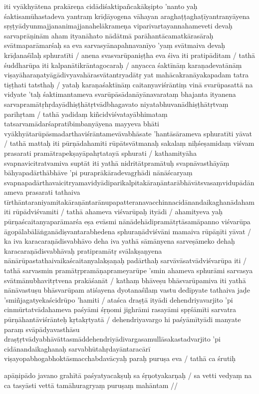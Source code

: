 iti vyākhyātena prakāreṇa cidādiśaktipañcakākṣipto 'nanto yaḥ śaktisamūhastadeva yantraṃ krīḍāyogena vāhayan araghaṭṭaghaṭīyantranyāyena sṛṣṭyādyunmajjananimajjanahelākrameṇa viparivartayannahameveti devaḥ sarvaprāṇinām aham ityanāhato nādātmā parāhantācamatkārasāraḥ svātmaparāmarśaḥ sa eva sarvasyānapahnavanīyo 'yaṃ svātmaiva devaḥ krīḍanaśīlaḥ sphuratīti  / anena svasvarūpaniṣṭha eva śiva iti pratipāditam  / tathā śuddharūpa iti kalpanātikrāntagocaraḥ  / anyacca śaktīnāṃ karaṇadevatānāṃ viṣayāharaṇatyāgādivyavahārasvātantryadātṛ yat mahācakranāyakapadam tatra tiṣṭhati tatsthaḥ  / yataḥ karaṇaśaktīnāṃ caitanyaviśrāntiṃ vinā svarūpasattā na vidyate 'taḥ śaktimantameva svarūpāsādanāyānavarataṃ bhajanta ityanena sarvapramātṛhṛdayādhiṣṭhātṛtvādbhagavato niyatabhuvanādhiṣṭhātṛtvaṃ parihṛtam  / tathā yadidaṃ kiñcidviśvatayābhimataṃ tatsarvamādarśapratibimbanyāyena mayyeva bhāti vyākhyātarūpāsmadarthaviśrāntamevāvabhāsate 'hantāsārameva sphuratīti yāvat  / tathā mattaḥ iti pūrṇādahamiti rūpātsvātmanaḥ sakalaṃ niḥśeṣamidaṃ viśvam prasarati pramātrapekṣayāpahṛtatayā sphurati  / kathamityāha svapnavicitratvamiva suptāt iti yathā nidritātpramātuḥ svapnāvasthāyāṃ bāhyapadārthābhāve 'pi puraprākāradevagṛhādi nānāścaryaṃ svapnapadārthavaicitryamavidyādiparikalpitakāraṇāntarābhāvātsvasaṃvidupādānameva prasarati tathaiva tīrthāntaraniyamitakāraṇāntarānupapatteranavacchinnacidānandaikaghanādahamiti rūpādviśvamiti  / tathā ahameva viśvarūpaḥ ityādi  / ahamityeva yaḥ pūrṇaścaitanyaparāmarśa eṣa evāsmi nānādehādipramātṛtāsamāpanno viśvarūpa āgopālabālāṅganādiṣvantarabhedena sphuraṇādviśvāni mamaiva rūpāṇīti yāvat  / ka iva karacaraṇādisvabhāvo deha iva yathā sāmānyena sarveṣāmeko dehaḥ karacaraṇādisvabhāvaḥ pratipramātṛ svālakṣaṇyena nānārūpastathaivaikaścaitanyalakṣaṇaḥ padārthaḥ sarvāvāsatvādviśvarūpa
iti  / tathā sarvasmin pramātṛpramāṇaprameyarūpe 'smin ahameva sphurāmi sarvasya svātmānubhavitṛtvena prakāśanāt  / kathaṃ bhāveṣu bhāsvarūpamiva iti yathā nānāvastuṣu bhāsvarūpam atiśayena dyotanaśīlaṃ vastu dedīpyate tathaiva jaḍe 'smiñjagatyekaścidrūpo 'hamiti  / ataśca draṣṭā ityādi dehendriyavarjito 'pi cinmūrtatvādahameva paśyāmi śṛṇomi jighrāmi rasayāmi spṛśāmīti sarvatra pūrṇāhantāviśrānteḥ kṛtakṛtyatā  / dehendriyavargo hi paśyāmītyādi manyate paraṃ svāpādyavasthāsu draṣṭṛtvādyabhāvāttasmāddehendriyādivargasamullāsakastadvarjito 'pi cidānandaikaghanaḥ sarvabhūtahṛdayāntaracārī viṣayopabhogabhoktāsmacchabdavācyaḥ paraḥ puruṣa eva  / tathā ca śrutiḥ

apāṇipādo javano grahītā paśyatyacakṣuḥ sa śṛṇotyakarṇaḥ  /
sa vetti vedyaṃ na ca tasyāsti vettā tamāhuragryaṃ puruṣaṃ mahāntam  //

